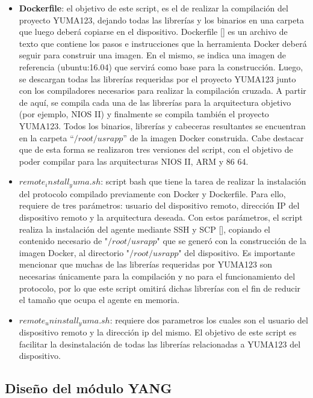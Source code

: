   \begin{itemize}
	\item \textbf{Dockerfile}: el objetivo de este script, es el de realizar la compilación del proyecto YUMA123, dejando todas las librerías y los binarios en una carpeta que luego deberá copiarse en el dispositivo. Dockerfile [] es un archivo de texto que contiene los pasos e instrucciones que la herramienta Docker deberá seguir para construir una imagen. En el mismo, se indica una imagen de referencia (ubuntu:16.04) que servirá como base para la construcción. Luego, se descargan todas las librerías requeridas por el proyecto YUMA123 junto con los compiladores necesarios para realizar la compilación cruzada. A partir de aquí, se compila cada una de las librerías para la arquitectura objetivo (por ejemplo, NIOS II) y finalmente se compila también el proyecto YUMA123. Todos los binarios, librerías y cabeceras resultantes se encuentran en la carpeta “$/root/usrapp$” de la imagen Docker construida. Cabe destacar que de esta forma se realizaron tres versiones del script, con el objetivo de poder compilar para las arquitecturas NIOS II, ARM y 86 64.
    
    \item \textbf{$remote_install_yuma.sh$}: script bash que tiene la tarea de realizar la instalación del protocolo compilado previamente con Docker y Dockerfile. Para ello, requiere de tres parámetros: usuario del dispositivo remoto, dirección IP del dispositivo remoto y la arquitectura deseada. Con estos parámetros, el script realiza la instalación del agente mediante SSH y SCP [], copiando el contenido necesario de "$/root/usrapp$" que se generó con la construcción de la imagen Docker, al directorio "$/root/usrapp$" del dispositivo. Es importante mencionar que muchas de las librerías requeridas por YUMA123 son necesarias únicamente para la compilación y no para el funcionamiento del protocolo, por lo que este script omitirá dichas librerías con el fin de reducir el tamaño que ocupa el agente en memoria.
    
    \item \textbf{$remote_uninstall_yuma.sh$}: requiere dos parametros los cuales son el usuario del dispositivo remoto y la dirección ip del mismo. El objetivo de este script es facilitar la desinstalación de todas las librerías relacionadas a YUMA123 del dispositivo.

\end{itemize}


\subsection{Diseño del módulo YANG}

